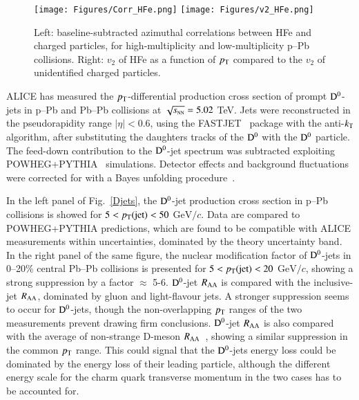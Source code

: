 \documentclass{webofc}
\newcommand{\sqrtsNN}{\sqrt{s_{\rm \scriptscriptstyle NN}}}
\newcommand{\gevc}{\mathrm{GeV}/c}
\newcommand{\pt}{p_{\rm T}}
\newcommand{\Dzero}{{\rm D^0}}
\begin{document}
\begin{figure}[h]
\centering
\texttt{[image: Figures/Corr\_HFe.png]}
\texttt{[image: Figures/v2\_HFe.png]}
\caption{Left: baseline-subtracted azimuthal correlations between HFe and charged particles, for high-multiplicity and low-multiplicity p--Pb collisions. Right: $v_2$ of HFe as a function of $\pt$ compared to the $v_2$ of unidentified charged particles.}
\label{Hfe_h}       %
\end{figure}

ALICE has measured the $\pt$-differential production cross section of prompt $\Dzero$-jets in p--Pb and Pb--Pb collisions at $\sqrtsNN = 5.02$ TeV. Jets were reconstructed in the pseudorapidity range $|\eta| < 0.6$, using the FASTJET~\cite{Cacciari:2011ma} package with the anti-$k_{\rm T}$ algorithm, after substituting the daughters tracks of the $\Dzero$ with the $\Dzero$ particle. The feed-down contribution to the $\Dzero$-jet spectrum was subtracted exploiting POWHEG+PYTHIA~\cite{Nason:2004rx,Jadach:2015mza} simulations. Detector effects and background fluctuations were corrected for with a Bayes unfolding procedure~\cite{DAgostini:2010hil}.

In the left panel of Fig.~\ref{Djets}, the $\Dzero$-jet production cross section in p--Pb collisions is showed for $5 < \pt({\rm jet}) < 50$ $\gevc$. Data are compared to POWHEG+PYTHIA predictions, which are found to be compatible with ALICE measurements within uncertainties, dominated by the theory uncertainty band.
In the right panel of the same figure, the nuclear modification factor of $\Dzero$-jets in 0--20\% central Pb--Pb collisions is presented for $5 < \pt({\rm jet}) < 20$ $\gevc$, showing a strong suppression by a factor $\approx$ 5-6. $\Dzero$-jet $R_{\rm AA}$ is compared with the inclusive-jet $R_{\rm AA}$, dominated by gluon and light-flavour jets. A stronger suppression seems to occur for $\Dzero$-jets, though the non-overlapping $\pt$ ranges of the two measurements prevent drawing firm conclusions. $\Dzero$-jet $R_{\rm AA}$ is also compared with the average of non-strange D-meson $R_{\rm AA}$~\cite{Acharya:2018hre}, showing a similar suppression in the common $\pt$ range. This could signal that the $\Dzero$-jets energy loss could be dominated by the energy loss of their leading particle, although the different energy scale for the charm quark transverse momentum in the two cases has to be accounted for.
\end{document}
